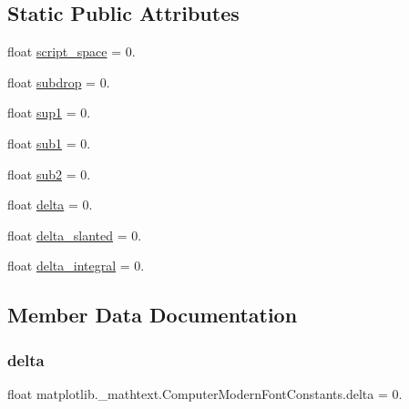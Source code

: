 \subsection*{Static Public Attributes}
\begin{DoxyCompactItemize}
\item 
float \hyperlink{classmatplotlib_1_1__mathtext_1_1ComputerModernFontConstants_a5545e59a5875ebb34c2fbb53b5c8c251}{script\+\_\+space} = 0.
\item 
float \hyperlink{classmatplotlib_1_1__mathtext_1_1ComputerModernFontConstants_ad2a1fe7994c325bb69b016e00936e250}{subdrop} = 0.
\item 
float \hyperlink{classmatplotlib_1_1__mathtext_1_1ComputerModernFontConstants_a40dfe2995c9334ca7185a52b03c4fa7a}{sup1} = 0.
\item 
float \hyperlink{classmatplotlib_1_1__mathtext_1_1ComputerModernFontConstants_af6c547a99c64be8c345b48adf2a2f6ea}{sub1} = 0.
\item 
float \hyperlink{classmatplotlib_1_1__mathtext_1_1ComputerModernFontConstants_a24bc6ec6c7e7733b4c01a22545280452}{sub2} = 0.
\item 
float \hyperlink{classmatplotlib_1_1__mathtext_1_1ComputerModernFontConstants_a1067ee0de9fd68784f02cf8529666208}{delta} = 0.
\item 
float \hyperlink{classmatplotlib_1_1__mathtext_1_1ComputerModernFontConstants_acdad9f6a0a0d9dc4ba7207388906cd93}{delta\+\_\+slanted} = 0.
\item 
float \hyperlink{classmatplotlib_1_1__mathtext_1_1ComputerModernFontConstants_a195dd40675c0a560f4aa0da26dfdc775}{delta\+\_\+integral} = 0.
\end{DoxyCompactItemize}


\subsection{Member Data Documentation}
\mbox{\label{classmatplotlib_1_1__mathtext_1_1ComputerModernFontConstants_a1067ee0de9fd68784f02cf8529666208}} 
\subsubsection{\texorpdfstring{delta}{delta}}
{\footnotesize\ttfamily float matplotlib.\+\_\+mathtext.\+Computer\+Modern\+Font\+Constants.\+delta = 0.\hspace{0.3cm}{\ttfamily [static]}}

